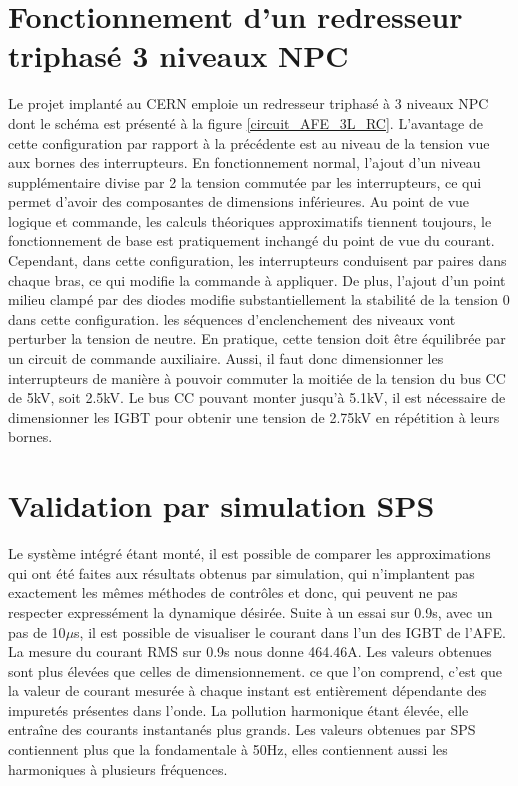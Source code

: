 \section{Fonctionnement d'un redresseur triphasé 3 niveaux NPC}
Le projet implanté au CERN emploie un redresseur triphasé à 3 niveaux NPC dont le schéma est présenté à la figure \ref{circuit_AFE_3L_RC}. L'avantage de cette configuration par rapport à la précédente est au niveau de la tension vue aux bornes des interrupteurs. En fonctionnement normal, l'ajout d'un niveau supplémentaire divise par 2 la tension commutée par les interrupteurs, ce qui permet d'avoir des composantes de dimensions inférieures. Au point de vue logique et commande, les calculs théoriques approximatifs tiennent toujours, le fonctionnement  de base est pratiquement inchangé du point de vue du courant. Cependant, dans cette configuration, les interrupteurs conduisent par paires dans chaque bras, ce qui modifie la commande à appliquer. De plus, l'ajout d'un point milieu \og clampé \fg{} par des diodes modifie substantiellement la stabilité de la tension 0 dans cette configuration. les séquences d'enclenchement des niveaux vont perturber la tension de neutre. En pratique, cette tension doit être équilibrée par un circuit de commande auxiliaire. Aussi, il faut donc dimensionner les interrupteurs de manière à pouvoir commuter la moitiée de la tension du bus CC de  5kV, soit 2.5kV. Le bus CC pouvant monter jusqu'à 5.1kV, il est nécessaire de dimensionner les IGBT pour obtenir une tension de 2.75kV en répétition à leurs bornes. 

\section{Validation par simulation SPS}
Le système intégré étant monté, il est possible de comparer les approximations qui ont été faites aux résultats obtenus par simulation, qui n'implantent pas exactement les mêmes méthodes de contrôles et donc, qui peuvent ne pas respecter expressément la dynamique désirée. Suite à un essai sur 0.9s, avec un pas de 10$\mu$s, il est possible de visualiser le courant dans l'un des IGBT de l'AFE. La mesure du courant RMS sur 0.9s nous donne 464.46A. Les valeurs obtenues sont plus élevées que celles de dimensionnement. ce que l'on comprend, c'est que la valeur de courant mesurée à chaque instant est entièrement dépendante des impuretés présentes dans l'onde. La pollution harmonique étant élevée, elle entraîne des courants instantanés plus grands. Les valeurs obtenues par SPS contiennent plus que la fondamentale à 50Hz, elles contiennent aussi les harmoniques à plusieurs fréquences. 
 
 
